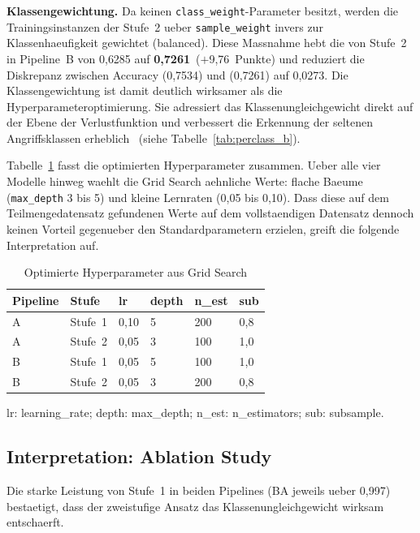 \textbf{Klassengewichtung.}
Da \gb{} keinen \texttt{class\_weight}-Parameter besitzt, werden die Trainingsinstanzen
der Stufe~2 ueber \texttt{sample\_weight} invers zur Klassenhaeufigkeit gewichtet
(\glqq{}balanced\grqq{}).
Diese Massnahme hebt die \ba{} von Stufe~2 in Pipeline~B von 0{,}6285 auf
\textbf{0{,}7261}~($+$9{,}76~Punkte) und reduziert die Diskrepanz zwischen Accuracy
(0{,}7534) und \ba{} (0{,}7261) auf 0{,}0273.
Die Klassengewichtung ist damit deutlich wirksamer als die Hyperparameteroptimierung.
Sie adressiert das Klassenungleichgewicht direkt auf der Ebene der Verlustfunktion und
verbessert die Erkennung der seltenen Angriffsklassen erheblich~\cite{hosseini2025imbalance}
(siehe Tabelle~\ref{tab:perclass_b}).

Tabelle~\ref{tab:best_hp} fasst die optimierten Hyperparameter zusammen.
Ueber alle vier Modelle hinweg waehlt die Grid Search aehnliche Werte: flache Baeume
(\texttt{max\_depth} 3 bis 5) und kleine Lernraten (0,05 bis 0,10).
Dass diese auf dem Teilmengedatensatz gefundenen Werte auf dem vollstaendigen Datensatz dennoch
keinen Vorteil gegenueber den Standardparametern erzielen, greift die folgende Interpretation
auf.

\begin{table}[h]
\centering
\caption{Optimierte Hyperparameter aus Grid Search}
\label{tab:best_hp}
\begin{tabular}{llllll}
\toprule
Pipeline & Stufe & lr & depth & n\_est & sub \\
\midrule
A & Stufe~1 & 0{,}10 & 5 & 200 & 0{,}8 \\
A & Stufe~2 & 0{,}05 & 3 & 100 & 1{,}0 \\
B & Stufe~1 & 0{,}05 & 5 & 100 & 1{,}0 \\
B & Stufe~2 & 0{,}05 & 3 & 200 & 0{,}8 \\
\bottomrule
\end{tabular}
\smallskip\newline
{\footnotesize lr: learning\_rate; depth: max\_depth; n\_est: n\_estimators; sub: subsample.}
\end{table}

\subsection{Interpretation: Ablation Study}

Die starke Leistung von Stufe~1 in beiden Pipelines (BA jeweils ueber 0{,}997) bestaetigt,
dass der zweistufige Ansatz das Klassenungleichgewicht wirksam entschaerft.

